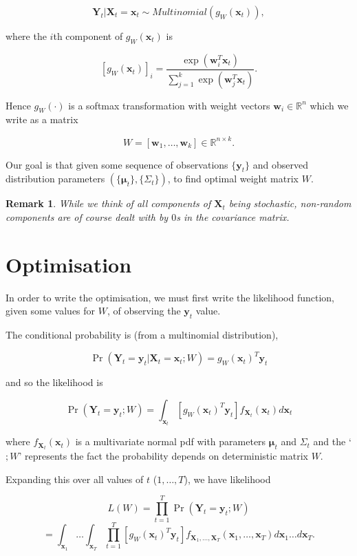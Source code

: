 \documentclass[
10pt, %
a4paper, %
oneside, %
headinclude,footinclude, %
BCOR5mm, %
]{scrartcl}
\newcommand{\bfmu}{\boldsymbol{\mu}}
\newcommand{\bfX}{\boldsymbol{X}}
\newcommand{\bfx}{\boldsymbol{x}}
\newcommand{\bfw}{\boldsymbol{w}}
\newcommand{\bfY}{\boldsymbol{Y}}
\newcommand{\bfy}{\boldsymbol{y}}
\newtheorem{remark}{Remark}
\begin{document}
$$ \bfY_t | \bfX_t = \bfx_t \sim Multinomial(g_W(\bfx_t)), $$

where the $i$th component of $g_W(\bfx_t)$ is

$$ [g_W(\bfx_t)]_i = \frac{\exp(\bfw_i^T \bfx_t)}{\sum_{j=1}^k \exp(\bfw_j^T \bfx_t)}.$$

Hence $g_W(\cdot)$ is a softmax transformation with weight vectors $\bfw_i \in \mathbb{R}^n$ which we write as a matrix

$$ W = [\bfw_1, \dots, \bfw_k] \in \mathbb{R}^{n \times k}. $$

Our goal is that given some sequence of observations $\{\bfy_t\}$ and observed distribution parameters $(\{\bfmu_t\}, \{\Sigma_t\})$, to find optimal weight matrix $W$.

\begin{remark}
While we think of all components of $\bfX_t$ being stochastic, non-random components are of course dealt with by $0$s in the covariance matrix.
\end{remark} 

 

\section{Optimisation}
In order to write the optimisation, we must first write the likelihood function, given some values for $W$, of observing the $\bfy_t$ value.

The conditional probability is (from a multinomial distribution),

$$ \Pr(\bfY_t = \bfy_t | \bfX_t = \bfx_t; W) = g_W(\bfx_t)^T \bfy_t $$

and so the likelihood is

$$ \Pr(\bfY_t = \bfy_t; W) = \int_{\bfx_t} \left [g_W(\bfx_t)^T \bfy_t \right ] f_{\bfX_t}(\bfx_t) d\bfx_t $$ 

where $f_{\bfX_t}(\bfx_t)$ is a multivariate normal pdf with parameters $\bfmu_t$ and $\Sigma_t$ and the `$;W$' represents the fact the probability depends on deterministic matrix $W$.

Expanding this over all values of $t$ ($1, \dots, T$), we have likelihood

$$ L(W) = \prod_{t=1}^T \Pr(\bfY_t = \bfy_t; W) $$
$$ = \int_{\bfx_1} \dots \int_{\bfx_T} \prod_{t=1}^T \left [g_W(\bfx_t)^T \bfy_t \right ] f_{\bfX_1,\dots,\bfX_T}(\bfx_1, \dots, \bfx_T) d\bfx_1 \dots d\bfx_T. $$
\end{document}
